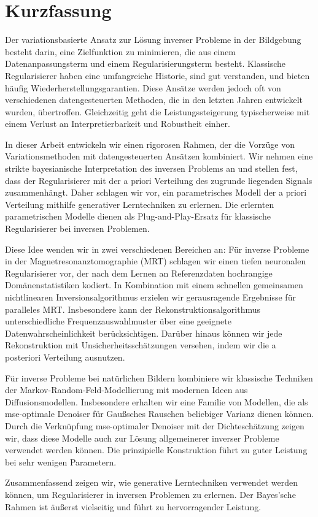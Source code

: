 \chapter*{Kurzfassung}
Der variationsbasierte Ansatz zur Lösung inverser Probleme in der Bildgebung besteht darin, eine Zielfunktion zu minimieren, die aus einem Datenanpassungsterm und einem Regularisierungsterm besteht.
Klassische Regularisierer haben eine umfangreiche Historie, sind gut verstanden, und bieten häufig Wiederherstellungsgarantien.
Diese Ansätze werden jedoch oft von verschiedenen datengesteuerten Methoden, die in den letzten Jahren entwickelt wurden, übertroffen.
Gleichzeitig geht die Leistungssteigerung typischerweise mit einem Verlust an Interpretierbarkeit und Robustheit einher.

In dieser Arbeit entwickeln wir einen rigorosen Rahmen, der die Vorzüge von Variationsmethoden mit datengesteuerten Ansätzen kombiniert.
Wir nehmen eine strikte bayesianische Interpretation des inversen Problems an und stellen fest, dass der Regularisierer mit der a priori Verteilung des zugrunde liegenden Signals zusammenhängt.
Daher schlagen wir vor, ein parametrisches Modell der a priori Verteilung mithilfe generativer Lerntechniken zu erlernen.
Die erlernten parametrischen Modelle dienen als Plug-and-Play-Ersatz für klassische Regularisierer bei inversen Problemen.

Diese Idee wenden wir in zwei verschiedenen Bereichen an:
Für inverse Probleme in der Magnetresonanztomographie (MRT) schlagen wir einen tiefen neuronalen Regularisierer vor, der nach dem Lernen an Referenzdaten hochrangige Domänenstatistiken kodiert.
In Kombination mit einem schnellen gemeinsamen nichtlinearen Inversionsalgorithmus erzielen wir gerausragende Ergebnisse für paralleles MRT.
Insbesondere kann der Rekonstruktionsalgorithmus unterschiedliche Frequenzauswahlmuster über eine geeignete Datenwahrscheinlichkeit berücksichtigen.
Darüber hinaus können wir jede Rekonstruktion mit Unsicherheitsschätzungen versehen, indem wir die a posteriori Verteilung ausnutzen.

Für inverse Probleme bei natürlichen Bildern kombiniere wir klassische Techniken der Markov-Random-Feld-Modellierung mit modernen Ideen aus Diffusionsmodellen.
Insbesondere erhalten wir eine Familie von Modellen, die als \gls{mse}-optimale Denoiser für Gaußsches Rauschen beliebiger Varianz dienen können.
Durch die Verknüpfung \gls{mse}-optimaler Denoiser mit der Dichteschätzung zeigen wir, dass diese Modelle auch zur Lösung allgemeinerer inverser Probleme verwendet werden können.
Die prinzipielle Konstruktion führt zu guter Leistung bei sehr wenigen Parametern.

Zusammenfassend zeigen wir, wie generative Lerntechniken verwendet werden können, um Regularisierer in inversen Problemen zu erlernen.
Der Bayes'sche Rahmen ist äußerst vielseitig und führt zu hervorragender Leistung.
